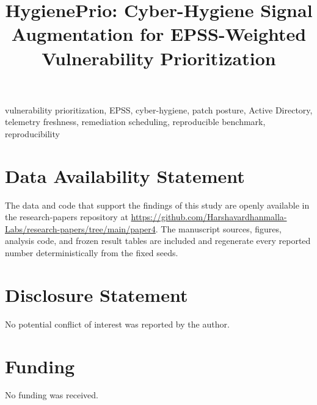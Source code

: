 \documentclass[journal]{IEEEtran}
\title{HygienePrio: Cyber-Hygiene Signal Augmentation for EPSS-Weighted
Vulnerability Prioritization}
\author{%
  \IEEEauthorblockN{Harshavardhan Malla}
  \IEEEauthorblockA{Independent Researcher\\
  Email: harshavardhanmalla75@gmail.com}%
}
\begin{document}
\maketitle

\begin{abstract}

\end{abstract}

\begin{IEEEkeywords}
vulnerability prioritization, EPSS, cyber-hygiene, patch posture,
Active Directory, telemetry freshness, remediation scheduling,
reproducible benchmark, reproducibility
\end{IEEEkeywords}

















\section*{Data Availability Statement}
The data and code that support the findings of this study are openly available in the research-papers repository at \url{https://github.com/Harshavardhanmalla-Labs/research-papers/tree/main/paper4}. The manuscript sources, figures, analysis code, and frozen result tables are included and regenerate every reported number deterministically from the fixed seeds.

\section*{Disclosure Statement}
No potential conflict of interest was reported by the author.

\section*{Funding}
No funding was received.

\end{document}
